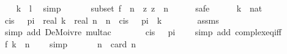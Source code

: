 \begin{isabellebody}
\ {\isacharasterisk}{\kern0pt}\ \isamarkupfalse%
\ {\isachardoublequoteopen}k\ {\isacharequal}{\kern0pt}\ l{\isachardoublequoteclose}\ \isamarkupfalse%
\ simp\isanewline
\ \ \isamarkupfalse%
\isanewline
\isanewline
\ \ \isamarkupfalse%
\ subset{\isacharcolon}{\kern0pt}\ {\isachardoublequoteopen}{\isacharquery}{\kern0pt}f\ {\isacharbackquote}{\kern0pt}\ {\isacharbraceleft}{\kern0pt}{\isachardot}{\kern0pt}{\isachardot}{\kern0pt}{\isacharless}{\kern0pt}n{\isacharbraceright}{\kern0pt}\ {\isasymsubseteq}\ {\isacharbraceleft}{\kern0pt}z{\isachardot}{\kern0pt}\ z\ {\isacharcircum}{\kern0pt}\ n\ {\isacharequal}{\kern0pt}\ {}{\isacharbraceright}{\kern0pt}{\isachardoublequoteclose}\isanewline
\ \ \isamarkupfalse%
\ safe\isanewline
\ \ \ \ \isamarkupfalse%
\ k\ {\isacharcolon}{\kern0pt}{\isacharcolon}{\kern0pt}\ nat\isanewline
\ \ \ \ \isamarkupfalse%
\ {\isachardoublequoteopen}cis\ {\isacharparenleft}{\kern0pt}{}\ {\isacharasterisk}{\kern0pt}\ pi\ {\isacharasterisk}{\kern0pt}\ real\ k\ {\isacharslash}{\kern0pt}\ real\ n{\isacharparenright}{\kern0pt}\ {\isacharcircum}{\kern0pt}\ n\ {\isacharequal}{\kern0pt}\ cis\ {\isacharparenleft}{\kern0pt}{}\ {\isacharasterisk}{\kern0pt}\ pi{\isacharparenright}{\kern0pt}\ {\isacharcircum}{\kern0pt}\ k{\isachardoublequoteclose}\isanewline
\ \ \ \ \ \ \isamarkupfalse%
\ assms\ \isamarkupfalse%
\ {\isacharparenleft}{\kern0pt}simp\ add{\isacharcolon}{\kern0pt}\ DeMoivre\ mult{\isacharunderscore}{\kern0pt}ac{\isacharparenright}{\kern0pt}\isanewline
\ \ \ \ \isamarkupfalse%
\ \isamarkupfalse%
\ {\isachardoublequoteopen}cis\ {\isacharparenleft}{\kern0pt}{}\ {\isacharasterisk}{\kern0pt}\ pi{\isacharparenright}{\kern0pt}\ {\isacharequal}{\kern0pt}\ {}{\isachardoublequoteclose}\ \isamarkupfalse%
\ {\isacharparenleft}{\kern0pt}simp\ add{\isacharcolon}{\kern0pt}\ complex{\isacharunderscore}{\kern0pt}eq{\isacharunderscore}{\kern0pt}iff{\isacharparenright}{\kern0pt}\isanewline
\ \ \ \ \isamarkupfalse%
\ \isamarkupfalse%
\ {\isachardoublequoteopen}{\isacharquery}{\kern0pt}f\ k\ {\isacharcircum}{\kern0pt}\ n\ {\isacharequal}{\kern0pt}\ {}{\isachardoublequoteclose}\ \isamarkupfalse%
\ simp\isanewline
\ \ \isamarkupfalse%
\isanewline
\isanewline
\ \ \isamarkupfalse%
\ {\isachardoublequoteopen}n\ {\isacharequal}{\kern0pt}\ card\ {\isacharbraceleft}{\kern0pt}{\isachardot}{\kern0pt}{\isachardot}{\kern0pt}{\isacharless}{\kern0pt}n{\isacharbraceright}{\kern0pt}{\isachardoublequoteclose}\ \isamarkupfalse%

\end{isabellebody}

